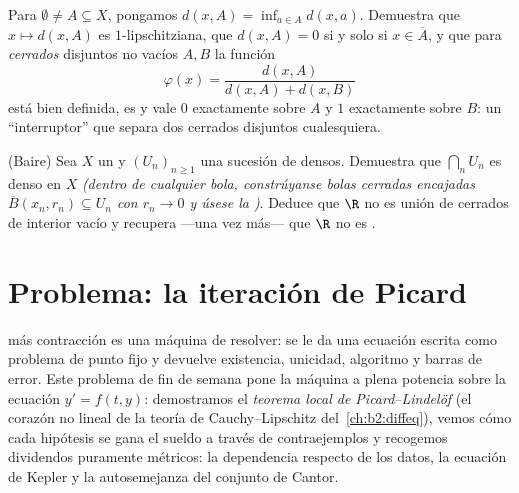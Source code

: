 \begin{exercise}[$\star\star$]\label{exo:b2:metric:11}
Para $\emptyset \neq A \subseteq X$, pongamos $d(x, A) = \inf_{a \in
A} d(x, a)$. Demuestra que $x \mapsto d(x, A)$ es $1$-lipschitziana,
que $d(x, A) = 0$ si y solo si $x \in \overline A$, y que para
\emph{cerrados} disjuntos no vacíos $A, B$ la función
\[
\varphi(x) = \frac{d(x, A)}{d(x, A) + d(x, B)}
\]
está bien definida, es  y vale $0$ exactamente sobre $A$ y
$1$ exactamente sobre $B$: un ``interruptor''  que separa dos
cerrados disjuntos cualesquiera.
\end{exercise}

\begin{exercise}[$\star\star\star$]\label{exo:b2:metric:12}
(Baire) Sea $X$ un  y $(U_n)_{n\geq1}$ una
sucesión de  densos. Demuestra que $\bigcap_n U_n$ es denso
en $X$ \emph{(dentro de cualquier bola, constrúyanse bolas cerradas
encajadas $\overline B(x_n, r_n) \subseteq U_n$ con $r_n \to 0$ y
úsese la )}. Deduce que $\R$ no es unión  de
cerrados de interior vacío y recupera ---una vez más--- que $\R$ no
es .
\end{exercise}

\section{Problema: la iteración de Picard}

 más contracción es una máquina de resolver: se le da
una ecuación escrita como problema de punto fijo y devuelve
existencia, unicidad, algoritmo y barras de error. Este problema de
fin de semana pone la máquina a plena potencia sobre la ecuación $y' =
f(t, y)$: demostramos el \emph{teorema local de Picard--Lindelöf} (el
corazón no lineal de la teoría de Cauchy--Lipschitz del~\cref{ch:b2:diffeq}), vemos cómo cada hipótesis se gana el sueldo a
través de contraejemplos y recogemos dividendos puramente métricos: la
dependencia  respecto de los datos, la ecuación de Kepler y la
autosemejanza del conjunto de Cantor.

